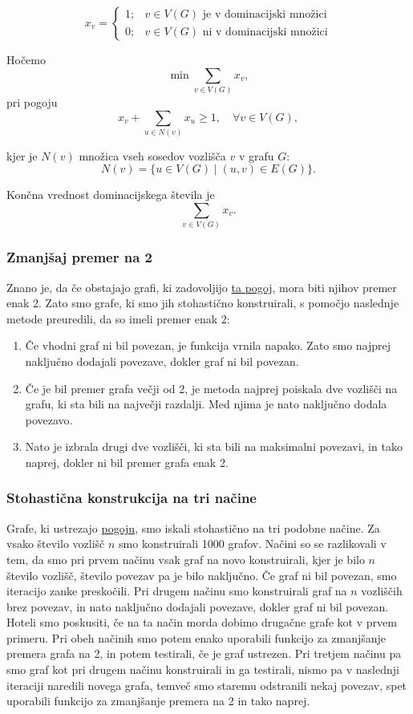 \documentclass[a4paper,12pt]{article}
\theoremstyle{definition}
\begin{document}
$$ 
x_v =
\begin{cases} 
      1; & v \in V(G) \text{ je v dominacijski množici} \\
      0; & v \in V(G) \text{ ni v dominacijski množici} 
\end{cases}
$$

Hočemo
$$
\min \sum_{v\in V(G)} x_v,
$$
pri pogoju
$$
x_v + \sum_{u \in N(v)} x_u \geq 1, \quad \forall v \in V(G),
$$

kjer je $N(v)$ množica vseh sosedov vozlišča $v$ v grafu $G$:  
$$
N(v) = \{ u \in V(G) \mid (u,v) \in E(G) \}.
$$

Končna vrednost dominacijskega števila je
$$
\sum_{v\in V(G)} x_v.
$$

\subsubsection{Zmanjšaj premer na 2}
\noindent Znano je, da če obstajajo grafi, ki zadovoljijo \hyperref[pogoj]{ta pogoj}, mora biti njihov premer enak 2. Zato smo grafe, ki smo jih stohastično konstruirali, s pomočjo naslednje metode preuredili, da so imeli premer enak 2:
\begin{enumerate}
    \item Če vhodni graf ni bil povezan, je funkcija vrnila napako. Zato smo najprej naključno dodajali povezave, dokler graf ni bil povezan.
    \item Če je bil premer grafa večji od 2, je metoda najprej poiskala dve vozlišči na grafu, ki sta bili na največji razdalji. Med  njima je nato naključno dodala povezavo.
    \item Nato je izbrala drugi dve vozlišči, ki sta bili na maksimalni povezavi, in tako naprej, dokler ni bil premer grafa enak 2.
\end{enumerate}

\subsubsection{Stohastična konstrukcija na tri načine}\label{stohasticna}
\noindent Grafe, ki ustrezajo \hyperref[pogoj]{pogoju}, smo iskali stohastično na tri podobne načine. Za vsako število vozlišč $n$ smo konstruirali 1000 grafov. Načini so se razlikovali v tem, da smo pri prvem načinu vsak graf na novo konstruirali, kjer je bilo $n$ število vozlišč, število povezav pa je bilo naključno. Če graf ni bil povezan, smo iteracijo zanke preskočili. Pri drugem načinu smo konstruirali graf na $n$ vozliščih brez povezav, in nato naključno dodajali povezave, dokler graf ni bil povezan. Hoteli smo poskusiti, če na ta način morda dobimo drugačne grafe kot v prvem primeru. Pri obeh načinih smo potem enako uporabili funkcijo za zmanjšanje premera grafa na 2, in potem testirali, če je graf ustrezen. Pri tretjem načinu pa smo graf kot pri drugem načinu konstruirali in ga testirali, nismo pa v naslednji iteraciji naredili novega grafa, temveč smo staremu odstranili nekaj povezav, spet uporabili funkcijo za zmanjšanje premera na 2 in tako naprej.
\end{document}
